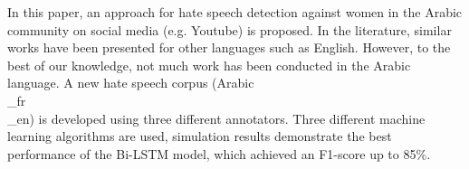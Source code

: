 In this paper, an approach for hate speech detection against women in the Arabic community on social media (e.g. Youtube) is proposed. In the literature, similar works have been presented for other languages such as English. However, to the best of our knowledge, not much work has been conducted in the Arabic language. A new hate speech corpus (Arabic\\_fr\\_en) is developed using three different annotators. Three different machine learning algorithms are used, simulation results demonstrate the best performance of the Bi-LSTM model, which achieved an F1-score up to 85\%.
